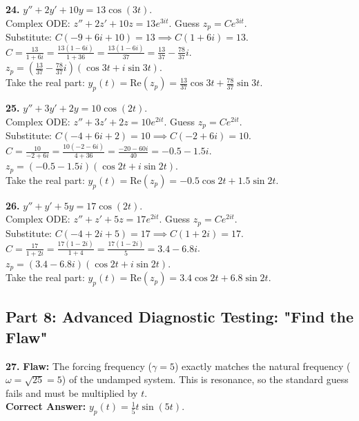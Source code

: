 \documentclass[11pt]{article}
\begin{document}
\textbf{24.} $y'' + 2y' + 10y = 13 \cos(3t)$. \\
Complex ODE: $z'' + 2z' + 10z = 13 e^{3it}$. Guess $z_p = C e^{3it}$. \\
Substitute: $C(-9 + 6i + 10) = 13 \implies C(1 + 6i) = 13$. \\
$C = \frac{13}{1 + 6i} = \frac{13(1 - 6i)}{1 + 36} = \frac{13(1 - 6i)}{37} = \frac{13}{37} - \frac{78}{37}i$. \\
$z_p = (\frac{13}{37} - \frac{78}{37}i)(\cos 3t + i \sin 3t)$. \\
Take the real part: $y_p(t) = \text{Re}(z_p) = \frac{13}{37} \cos 3t + \frac{78}{37} \sin 3t$.

\vspace{0.5cm}
\textbf{25.} $y'' + 3y' + 2y = 10 \cos(2t)$. \\
Complex ODE: $z'' + 3z' + 2z = 10 e^{2it}$. Guess $z_p = C e^{2it}$. \\
Substitute: $C(-4 + 6i + 2) = 10 \implies C(-2 + 6i) = 10$. \\
$C = \frac{10}{-2 + 6i} = \frac{10(-2 - 6i)}{4 + 36} = \frac{-20 - 60i}{40} = -0.5 - 1.5i$. \\
$z_p = (-0.5 - 1.5i)(\cos 2t + i \sin 2t)$. \\
Take the real part: $y_p(t) = \text{Re}(z_p) = -0.5 \cos 2t + 1.5 \sin 2t$.

\vspace{0.5cm}
\textbf{26.} $y'' + y' + 5y = 17 \cos(2t)$. \\
Complex ODE: $z'' + z' + 5z = 17 e^{2it}$. Guess $z_p = C e^{2it}$. \\
Substitute: $C(-4 + 2i + 5) = 17 \implies C(1 + 2i) = 17$. \\
$C = \frac{17}{1 + 2i} = \frac{17(1 - 2i)}{1 + 4} = \frac{17(1 - 2i)}{5} = 3.4 - 6.8i$. \\
$z_p = (3.4 - 6.8i)(\cos 2t + i \sin 2t)$. \\
Take the real part: $y_p(t) = \text{Re}(z_p) = 3.4 \cos 2t + 6.8 \sin 2t$.

\subsection*{Part 8: Advanced Diagnostic Testing: "Find the Flaw"}

\textbf{27.} \textbf{Flaw:} The forcing frequency ($\gamma = 5$) exactly matches the natural frequency ($\omega = \sqrt{25} = 5$) of the undamped system. This is resonance, so the standard guess fails and must be multiplied by $t$. \\
\textbf{Correct Answer:} $y_p(t) = \frac{1}{5} t \sin(5t)$.
\end{document}
